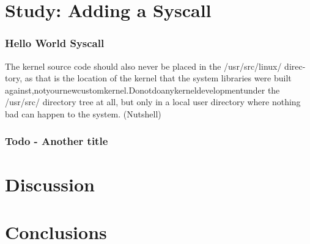 \documentclass{article}
\begin{document}
\section{Study: Adding a Syscall}

\subsubsection{Hello World Syscall}
\lipsum[1]
The kernel source code should also never be placed in the /usr/src/linux/ direc- tory, as that is the location of the kernel that the system libraries were built against,notyournewcustomkernel.Donotdoanykerneldevelopmentunder the /usr/src/ directory tree at all, but only in a local user directory where nothing bad can happen to the system.
(Nutshell)

\subsubsection{Todo - Another title}
\lipsum[1]


\section{Discussion}
\lipsum[1]

\section{Conclusions}
\lipsum[1]


\vspace{-7.5mm}
\renewcommand{\refname}{\section{References}}

\end{document}
